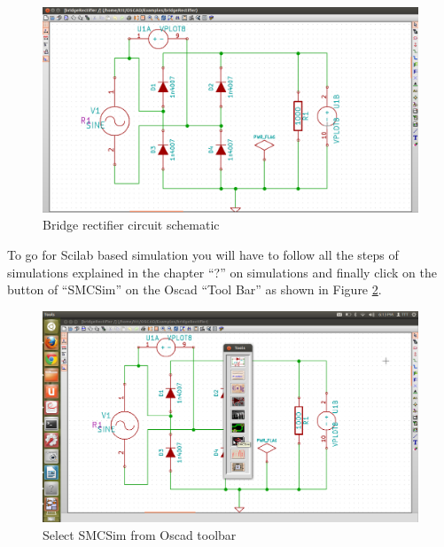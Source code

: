 \begin{figure}[h]%
\begin{center}
\includegraphics[width=1\linewidth]{figures/SMCSim-B-Rectifier.png}%
\caption{Bridge rectifier circuit schematic}
\label{bschem}
\end{center}
\end{figure}

To go for Scilab based simulation you will have to follow all the steps of simulations explained in the chapter “?” on simulations and finally click on the button of “SMCSim” on the Oscad “Tool Bar” as shown in Figure \ref{smc}.

\begin{figure}[h]%
\begin{center}
\includegraphics[width=1\linewidth]{figures/select-SMCSim.png}%
\caption{Select SMCSim from Oscad toolbar}
\label{smc}
\end{center}
\end{figure}

